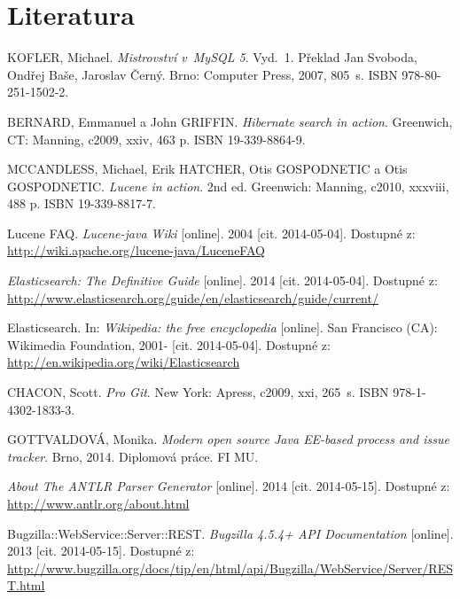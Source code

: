 \documentclass[11pt,oneside]{fithesis2}
\begin{document}
\printindex

\begingroup
\def\tmpchapter{0}
\renewcommand{\chaptername}{}
\renewcommand{\thechapter}{}
\chapter{Literatura}
\renewcommand{\chapter}[2]{}%

\begin{thebibliography}{1}

KOFLER, Michael. \textit{Mistrovství v~MySQL 5}. Vyd.~1. Překlad Jan Svoboda, Ondřej Baše, Jaroslav Černý. Brno: Computer Press, 2007, 805~s. ISBN 978-80-251-1502-2. 

BERNARD, Emmanuel a John GRIFFIN. \textit{Hibernate search in action}. Greenwich, CT: Manning, c2009, xxiv, 463 p. ISBN 19-339-8864-9. 

MCCANDLESS, Michael, Erik HATCHER, Otis GOSPODNETIC a Otis GOSPODNETIC. \textit{Lucene in action}. 2nd ed. Greenwich: Manning, c2010, xxxviii, 488 p. ISBN 19-339-8817-7. 

Lucene FAQ. \textit{Lucene-java Wiki} [online]. 2004 [cit. 2014-05-04]. Dostupné z: \url{http://wiki.apache.org/lucene-java/LuceneFAQ}

\textit{Elasticsearch: The Definitive Guide} [online]. 2014 [cit. 2014-05-04]. Dostupné z: \url{http://www.elasticsearch.org/guide/en/elasticsearch/guide/current/}

Elasticsearch. In: \textit{Wikipedia: the free encyclopedia} [online]. San Francisco (CA): Wikimedia Foundation, 2001- [cit. 2014-05-04]. Dostupné z: \url{http://en.wikipedia.org/wiki/Elasticsearch}

CHACON, Scott. \textit{Pro Git}. New York: Apress, c2009, xxi, 265~s. ISBN 978-1-4302-1833-3. 

GOTTVALDOVÁ, Monika. \textit{Modern open source Java EE-based process and issue tracker}. Brno, 2014. Diplomová práce. FI MU.

\textit{About The ANTLR Parser Generator} [online]. 2014 [cit. 2014-05-15]. Dostupné z: \url{http://www.antlr.org/about.html}

Bugzilla::WebService::Server::REST. \textit{Bugzilla 4.5.4+ API Documentation} [online]. 2013 [cit. 2014-05-15]. Dostupné z: \url{http://www.bugzilla.org/docs/tip/en/html/api/Bugzilla/WebService/Server/REST.html}


\end{thebibliography}
\end{document}
